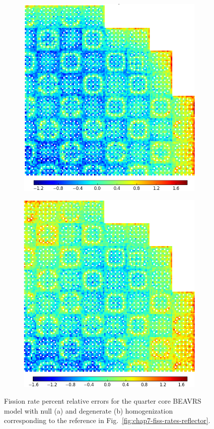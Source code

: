 \begin{figure}[h!]
\centering
\begin{subfigure}{\textwidth}
  \centering
  \includegraphics[width=0.6\linewidth]{figures/quantification/full-core/fiss-err-null}
  \caption{}
  \label{fig:chap8-full-core-fiss-err-null}
\end{subfigure}
\vspace{4mm}
\begin{subfigure}{\textwidth}
  \centering
  \includegraphics[width=0.6\linewidth]{figures/quantification/full-core/fiss-err-degenerate}
  \caption{}
  \label{fig:chap8-full-core-fiss-err-degenerate}
\end{subfigure}
\caption[Fission rate errors for the quarter core BEAVRS model]{Fission rate percent relative errors for the quarter core \ac{BEAVRS} model with null (a) and degenerate (b) homogenization corresponding to the reference in Fig.~\ref{fig:chap7-fiss-rates-reflector}.}
\label{fig:chap8-full-core-fiss-err}
\end{figure}

